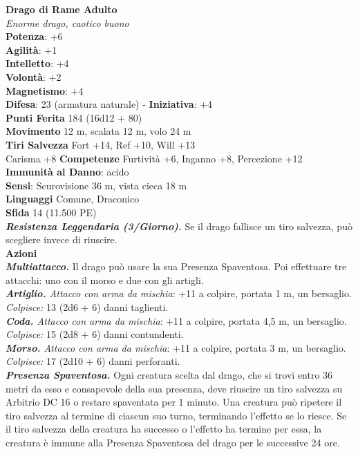 \begin{multicols}{2}
\medskip\textbf{Drago di Rame Adulto}\\
\emph{Enorme drago, caotico buono}\\
\textbf{Potenza}: +6\\
\textbf{Agilità}: +1\\
\textbf{Intelletto}: +4\\
\textbf{Volontà}: +2\\
\textbf{Magnetismo}: +4\\
\textbf{Difesa}: 23 (armatura naturale) - \textbf{Iniziativa}: +4\\
\textbf{Punti Ferita} 184 (16d12 + 80)\\
\textbf{Movimento} 12 m, scalata 12 m, volo 24 m\\
\textbf{Tiri Salvezza} Fort +14, Ref +10, Will +13\\
Carisma +8 \textbf{Competenze} Furtività +6, Inganno +8, Percezione +12\\
\textbf{Immunità al Danno}: acido\\
\textbf{Sensi}: Scurovisione 36 m, vista cieca 18 m\\
\textbf{Linguaggi} Comune, Draconico\\
\textbf{Sfida} 14 (11.500 PE)\smallskip\\
\emph{\textbf{Resistenza Leggendaria (3/Giorno).}} Se il drago fallisce un tiro salvezza, può scegliere invece di riuscire.\\
\smallskip\textbf{Azioni} \\
\emph{\textbf{Multiattacco.}} Il drago può usare la sua Presenza Spaventosa. Poi effettuare tre attacchi: uno con il morso e due con gli artigli.\\
\emph{\textbf{Artiglio.} Attacco con arma da mischia}: +11 a colpire, portata 1 m, un bersaglio.\\
\emph{Colpisce:} 13 (2d6 + 6) danni taglienti.\\
\emph{\textbf{Coda.} Attacco con arma da mischia}: +11 a colpire, portata 4,5 m, un bersaglio.\\
\emph{Colpisce:} 15 (2d8 + 6) danni contundenti.\\
\emph{\textbf{Morso.} Attacco con arma da mischia}: +11 a colpire, portata 3 m, un bersaglio.\\
\emph{Colpisce:} 17 (2d10 + 6) danni perforanti.\\
\emph{\textbf{Presenza Spaventosa.}} Ogni creatura scelta dal drago, che si trovi entro 36 metri da esso e consapevole della sua presenza, deve riuscire un tiro salvezza su Arbitrio DC 16 o restare spaventata per 1 minuto. Una creatura può ripetere il tiro salvezza al termine di ciascun suo turno, terminando l'effetto se lo riesce. Se il tiro salvezza della creatura ha successo o l'effetto ha termine per essa, la creatura è immune alla Presenza Spaventosa del drago per le successive 24 ore. \\

\end{multicols}
